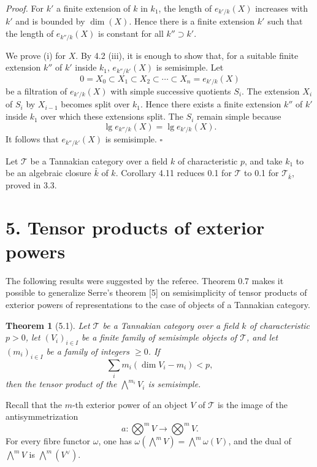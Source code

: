 \documentclass[10pt]{article}
\newcommand{\T}{\mathcal T}
\theoremstyle{deligne}
\newtheorem*{theorem*}{Theorem}
\newenvironment{proofdel}{\textit{Proof.}}{\hfill$\square$}
\newcommand{\heading}[1]{\vspace{0.7em}\noindent{\bfseries #1}\quad}
\begin{document}
\begin{proofdel}
For \(k'\) a finite extension of \(k\) in \(k_1\), the length of \(e_{k'/k}(X)\) increases with \(k'\) and is bounded by \(\dim(X)\). Hence there is a finite extension \(k'\) such that the length of \(e_{k''/k}(X)\) is constant for all \(k''\supset k'\).

We prove (i) for \(X\). By 4.2 (iii), it is enough to show that, for a suitable finite extension \(k''\) of \(k'\) inside \(k_1\), \(e_{k''/k'}(X)\) is semisimple. Let
\[
0=X_0\subset X_1\subset X_2\subset\cdots\subset X_n=e_{k'/k}(X)
\]
be a filtration of \(e_{k'/k}(X)\) with simple successive quotients \(S_i\). The extension \(X_i\) of \(S_i\) by \(X_{i-1}\) becomes split over \(k_1\). Hence there exists a finite extension \(k''\) of \(k'\) inside \(k_1\) over which these extensions split. The \(S_i\) remain simple because
\[
\operatorname{lg} e_{k''/k}(X)=\operatorname{lg} e_{k'/k}(X).
\]
It follows that \(e_{k''/k'}(X)\) is semisimple.
\end{proofdel}

\heading{4.12. Proof of 0.1.}
Let \(\T\) be a Tannakian category over a field \(k\) of characteristic \(p\), and take \(k_1\) to be an algebraic closure \(\bar k\) of \(k\). Corollary 4.11 reduces 0.1 for \(\T\) to 0.1 for \(\T_{\bar k}\), proved in 3.3.

\section*{5. Tensor products of exterior powers}

The following results were suggested by the referee. Theorem 0.7 makes it possible to generalize Serre's theorem [5] on semisimplicity of tensor products of exterior powers of representations to the case of objects of a Tannakian category.


\begin{theorem*}[5.1]
Let \(\T\) be a Tannakian category over a field \(k\) of characteristic \(p>0\), let \((V_i)_{i\in I}\) be a finite family of semisimple objects of \(\T\), and let \((m_i)_{i\in I}\) be a family of integers \(\ge 0\). If
\[
\tag{5.1.1}
  \sum_i m_i(\dim V_i-m_i)<p,
\]
then the tensor product of the \(\bigwedge^{m_i}V_i\) is semisimple.
\end{theorem*}

Recall that the \(m\)-th exterior power of an object \(V\) of \(\T\) is the image of the antisymmetrization
\[
  a:\bigotimes^m V\longrightarrow \bigotimes^m V.
\]
For every fibre functor \(\omega\), one has \(\omega(\bigwedge^m V)=\bigwedge^m\omega(V)\), and the dual of \(\bigwedge^m V\) is \(\bigwedge^m(V^\vee)\).
\end{document}
